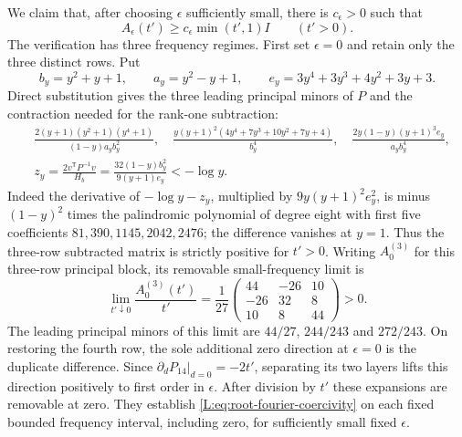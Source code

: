 \documentclass[11pt]{article}
\numberwithin{equation}{section}
\theoremstyle{definition}\newtheorem{definition}[theorem]{Definition}
\theoremstyle{remark}\newtheorem{remark}[theorem]{Remark}
\begin{document}
We claim that, after choosing $\epsilon$ sufficiently small, there is
$c_\epsilon>0$ such that
\begin{equation}\label{L:eq:root-fourier-coercivity}
 A_\epsilon(t')\ge c_\epsilon\min(t',1)I
 \qquad(t'>0).
\end{equation}
The verification has three frequency regimes. First set $\epsilon=0$
and retain only the three distinct rows. Put
\[
 b_y=y^2+y+1,\qquad a_y=y^2-y+1,\qquad
 e_y=3y^4+3y^3+4y^2+3y+3.
\]
Direct substitution gives the three leading principal minors of $P$ and
the contraction needed for the rank-one subtraction:
\[
\begin{aligned}
 &\frac{2(y+1)(y^2+1)(y^4+1)}{(1-y)a_yb_y^2},
 \quad\frac{y(y+1)^2(4y^4+7y^3+10y^2+7y+4)}{b_y^4},
 \quad\frac{2y(1-y)(y+1)^3e_y}{a_yb_y^4},\\
 &z_y=\frac{2v^{\mathsf T}P^{-1}v}{H_b}
       =\frac{32(1-y)b_y^2}{9(y+1)e_y}< -\log y.
\end{aligned}
\]
Indeed the derivative of $-\log y-z_y$, multiplied by
$9y(y+1)^2e_y^2$, is minus $(1-y)^2$ times the palindromic polynomial of
degree eight with first five coefficients $81,390,1145,2042,2476$;
the difference vanishes at $y=1$. Thus the three-row subtracted matrix
is strictly positive for $t'>0$. Writing $A_0^{(3)}$ for this three-row principal block, its removable
small-frequency limit is
\[
 \lim_{t'\downarrow0}\frac{A_0^{(3)}(t')}{t'}
 =\frac1{27}\begin{pmatrix}
 44&-26&10\\-26&32&8\\10&8&44
 \end{pmatrix}>0.
\]
The leading principal minors of this limit are $44/27$, $244/243$ and
$272/243$. On restoring the fourth row, the sole additional zero direction
at $\epsilon=0$ is the duplicate difference. Since
$\partial_dP_{14}|_{d=0}=-2t'$, separating its two layers lifts this
direction positively to first order in $\epsilon$. After division by
$t'$ these expansions are removable at zero. They establish
\eqref{L:eq:root-fourier-coercivity} on each fixed bounded frequency
interval, including zero, for sufficiently small fixed $\epsilon$.
\end{document}
